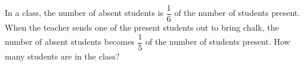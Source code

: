 In a class, the number of absent students is $\dfrac{1}{6}$ of the number of students present. When the teacher sends one of the present students out to bring chalk, the number of absent students becomes $\dfrac{1}{5}$ of the number of students present. How many students are in the class?
